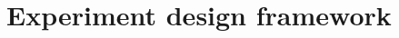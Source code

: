 \documentclass{article}
\begin{document}


\section{Experiment design framework}
\label{s:bayes}
\end{document}
